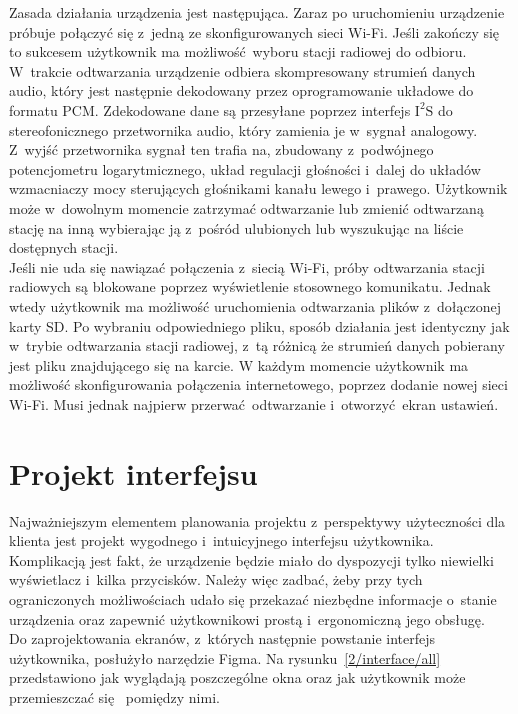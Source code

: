 \documentclass[polish]{aghengthesis}
\newcommand{\isqs}{$\text{I}^{2}\text{S}$}
\begin{document}
			Zasada działania urządzenia jest następująca.
			Zaraz po uruchomieniu urządzenie próbuje połączyć się z~jedną ze skonfigurowanych sieci Wi-Fi.
			Jeśli zakończy się to sukcesem użytkownik ma możliwość wyboru stacji radiowej do odbioru. W~trakcie odtwarzania urządzenie odbiera skompresowany strumień danych audio, który jest następnie dekodowany przez oprogramowanie układowe do formatu PCM. Zdekodowane dane są przesyłane poprzez interfejs \isqs{} do stereofonicznego przetwornika audio, który zamienia je w~sygnał analogowy. Z~wyjść przetwornika sygnał ten trafia na, zbudowany z~podwójnego potencjometru logarytmicznego, układ regulacji głośności i~dalej do układów wzmacniaczy mocy sterujących głośnikami kanału lewego i~prawego.
			Użytkownik może w~dowolnym momencie zatrzymać odtwarzanie lub zmienić odtwarzaną stację na inną wybierając ją z~pośród ulubionych lub wyszukując na liście dostępnych stacji.
			$ $\\
			
			Jeśli nie uda się nawiązać połączenia z~siecią Wi-Fi, próby odtwarzania stacji radiowych są blokowane poprzez wyświetlenie stosownego komunikatu.
			Jednak wtedy użytkownik ma możliwość uruchomienia odtwarzania plików z~dołączonej karty SD. Po wybraniu odpowiedniego pliku, sposób działania jest identyczny jak w~trybie odtwarzania stacji radiowej, z~tą różnicą że strumień danych pobierany jest pliku znajdującego się na karcie. 
			W każdym momencie użytkownik ma możliwość skonfigurowania połączenia internetowego, poprzez dodanie nowej sieci Wi-Fi.
			Musi jednak najpierw przerwać odtwarzanie i~otworzyć ekran ustawień.
	
	\section{Projekt interfejsu}
		\label{sec:ui}
		Najważniejszym elementem planowania projektu z~perspektywy użyteczności dla klienta jest projekt wygodnego i~intuicyjnego interfejsu użytkownika. Komplikacją jest fakt, że urządzenie będzie miało do dyspozycji tylko niewielki wyświetlacz i~kilka przycisków.
		Należy więc zadbać, żeby przy tych ograniczonych możliwościach udało się przekazać niezbędne informacje o~stanie urządzenia oraz zapewnić użytkownikowi prostą i~ergonomiczną jego obsługę.
		$ $\\

		Do zaprojektowania ekranów, z~których następnie powstanie interfejs użytkownika, posłużyło narzędzie Figma\textsuperscript{\cite{figma}}. Na rysunku~\ref{2/interface/all} przedstawiono jak wyglądają poszczególne okna oraz jak użytkownik może przemieszczać się  pomiędzy nimi.
		
\end{document}
